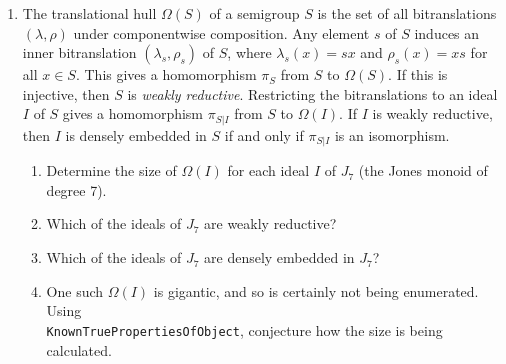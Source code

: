 \documentclass{article}
\begin{document}
\begin{enumerate}
  \item
    The translational hull $\Omega(S)$ of a semigroup $S$ is the set
    of all bitranslations $(\lambda, \rho)$
    under componentwise composition. Any element $s$ of $S$ induces
    an inner bitranslation $(\lambda_s, \rho_s)$ of $S$, where
    $\lambda_s(x) = sx$ and $\rho_s(x) = xs$ for all $x \in S$.
    This gives a homomorphism $\pi_S$ from $S$ to $\Omega(S)$. If
    this is injective, then $S$ is \emph{weakly reductive}.
    Restricting the bitranslations to an ideal $I$ of $S$ gives a
    homomorphism $\pi_{S|I}$ from $S$ to $\Omega(I)$.
    If $I$ is weakly reductive, then $I$ is densely embedded in $S$
    if and only if $\pi_{S|I}$ is an isomorphism.

    \begin{enumerate}
      \item
        Determine the size of $\Omega(I)$ for each ideal $I$ of $J_7$
        (the Jones monoid of degree 7).
      \item
        Which of the ideals of $J_7$ are weakly reductive?
      \item
        Which of the ideals of $J_7$ are densely embedded in $J_7$?
      \item
        One such $\Omega(I)$ is gigantic, and so is certainly not
        being enumerated. Using \\ \verb|KnownTruePropertiesOfObject|,
        conjecture how the size is being calculated.

    \end{enumerate}

\end{enumerate}
\end{document}
